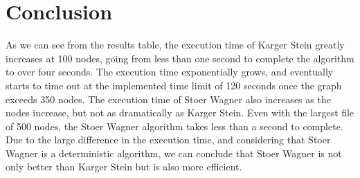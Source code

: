 \section{Conclusion}
As we can see from the results table, the execution time of Karger Stein greatly increases at 100 nodes, going from less than one second to complete the algorithm to over four seconds. The execution time exponentially grows, and eventually starts to time out at the implemented time limit of 120 seconds once the graph exceeds 350 nodes. The execution time of Stoer Wagner also increases as the nodes increase, but not as dramatically as Karger Stein. Even with the largest file of 500 nodes, the Stoer Wagner algorithm takes less than a second to complete. Due to the large difference in the execution time, and considering that Stoer Wagner is a deterministic algorithm, we can conclude that Stoer Wagner is not only better than Karger Stein but is also more efficient. 

\pagebreak